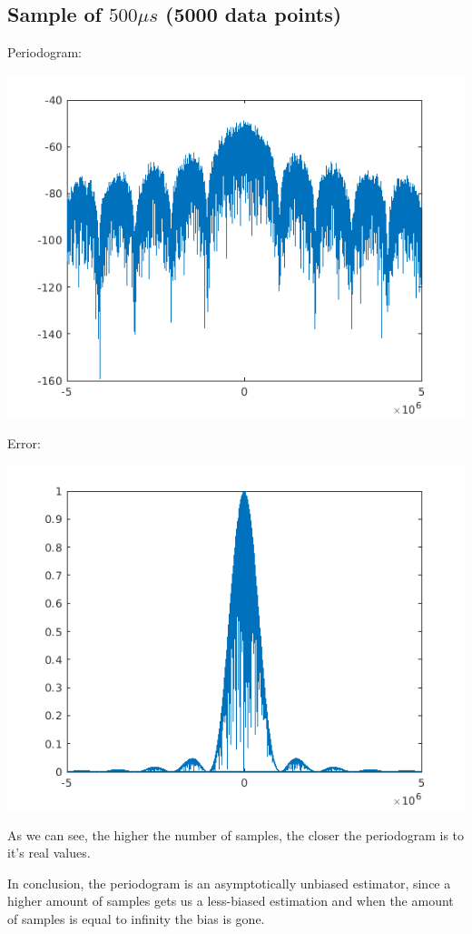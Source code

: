 \documentclass[conference,9pt]{IEEEtran}
\begin{document}
\subsection{Sample of $500\mu s$ (5000 data points)}

Periodogram:

\includegraphics[scale=0.5]{b1}

Error:

\includegraphics[scale=0.6]{error500.png}

As we can see, the higher the number of samples, the closer the periodogram is to it's real values.

In conclusion, the periodogram is an asymptotically unbiased estimator, since a higher amount of samples gets us a less-biased estimation and when the amount of samples is equal to infinity the bias is gone.
\end{document}
